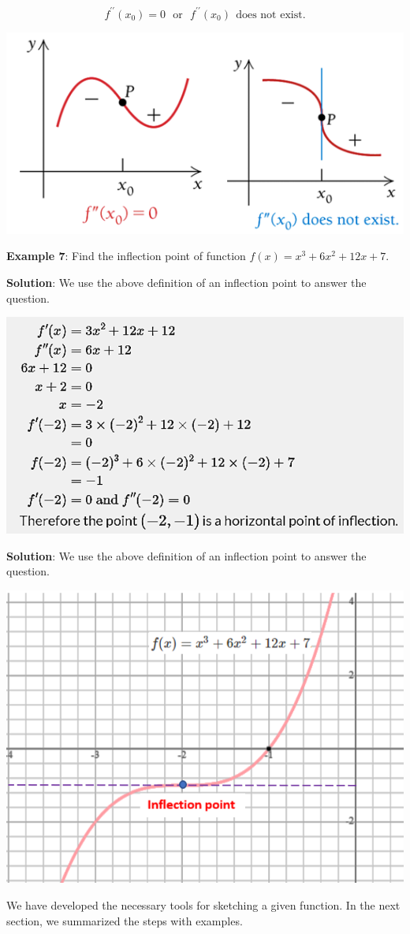 \documentclass[
]{book}
\begin{document}
\[
f^{\prime\prime}(x_0) = 0 ~~~\text{or}~~~ f^{\prime\prime}(x_0)~~\text{does not exist.}
\]

\begin{center}\includegraphics[width=0.45\linewidth]{img08/w08-inflectionDefinition} \end{center}

\hfill\break

\textbf{Example 7}: Find the inflection point of function \(f(x) = x^3+6x^2+12x+7\).

\textbf{Solution}: We use the above definition of an inflection point to answer the question.

\begin{flushleft}\includegraphics[width=0.6\linewidth]{img08/w08-Example07} \end{flushleft}

\textbf{Solution}: We use the above definition of an inflection point to answer the question.

\begin{center}\includegraphics[width=0.45\linewidth]{img08/w08-Example07-Graph} \end{center}

We have developed the necessary tools for sketching a given function. In the next section, we summarized the steps with examples.
\end{document}
